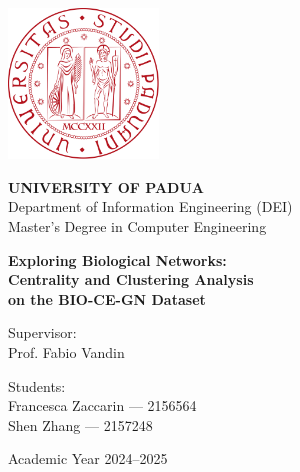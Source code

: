 \begin{titlepage}
    \begin{center}
        \vspace*{1cm}
        \includegraphics[width=4cm]{images/logo.png}
        
        \vspace{1.2cm}
        {\Large \textbf{UNIVERSITY OF PADUA}}\\[0.4cm]
        {\large \textmd{Department of Information Engineering (DEI)}}\\[0.2cm]
        {\large \textmd{Master's Degree in Computer Engineering}}
        
        \vspace{2.0cm}
        {\Huge \textbf{Exploring Biological Networks:}}\\[0.4cm]
        {\Huge \textbf{Centrality and Clustering Analysis}}\\[0.4cm]
        {\Huge \textbf{on the BIO-CE-GN Dataset}}
        
        \vspace{2.5cm}
        {\large \textmd{Supervisor:}}\\[0.2cm]
        {\large Prof. Fabio Vandin}
        
        \vspace{1.5cm}
        {\large \textmd{Students:}}\\[0.2cm]
        {\large Francesca Zaccarin — 2156564}\\[0.2cm]
        {\large Shen Zhang — 2157248}
        
        \vfill
        {\large Academic Year 2024–2025}
    \end{center}
\end{titlepage}
